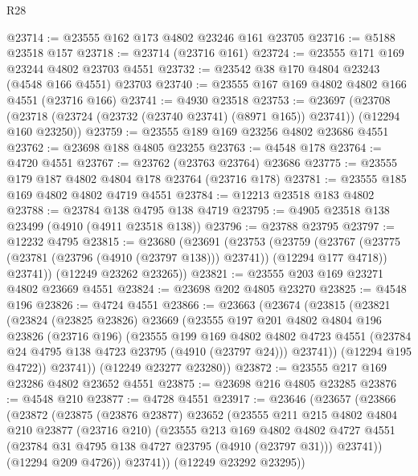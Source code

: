 \begin{lexlean}{R28}
\begin{coremodule}
@23714 := @23555 @162 @173 @4802 @23246 @161 @23705
@23716 := @5188 @23518 @157
@23718 := @23714 (@23716 @161)
@23724 := @23555 @171 @169 @23244 @4802 @23703 @4551
@23732 := @23542 @38 @170 @4804 @23243 (@4548 @166 @4551) @23703
@23740 := @23555 @167 @169 @4802 @4802 @166 @4551 (@23716 @166)
@23741 := @4930 @23518
@23753 := @23697
    (@23708 (@23718 (@23724 (@23732 (@23740 @23741) (@8971 @165)) @23741)) (@12294 @160 @23250))
@23759 := @23555 @189 @169 @23256 @4802 @23686 @4551
@23762 := @23698 @188 @4805 @23255
@23763 := @4548 @178
@23764 := @4720 @4551
@23767 := @23762 (@23763 @23764) @23686
@23775 := @23555 @179 @187 @4802 @4804 @178 @23764 (@23716 @178)
@23781 := @23555 @185 @169 @4802 @4802 @4719 @4551
@23784 := @12213 @23518 @183 @4802
@23788 := @23784 @138 @4795 @138 @4719
@23795 := @4905 @23518 @138 @23499 (@4910 (@4911 @23518 @138))
@23796 := @23788 @23795
@23797 := @12232 @4795
@23815 := @23680
    (@23691
      (@23753
        (@23759
          (@23767 (@23775 (@23781 (@23796 (@4910 (@23797 @138))) @23741)) (@12294 @177 @4718))
          @23741))
      (@12249 @23262 @23265))
@23821 := @23555 @203 @169 @23271 @4802 @23669 @4551
@23824 := @23698 @202 @4805 @23270
@23825 := @4548 @196
@23826 := @4724 @4551
@23866 := @23663
    (@23674
      (@23815
        (@23821
          (@23824
            (@23825 @23826)
            @23669
            (@23555
              @197
              @201
              @4802
              @4804
              @196
              @23826
              (@23716 @196)
              (@23555
                @199
                @169
                @4802
                @4802
                @4723
                @4551
                (@23784 @24 @4795 @138 @4723 @23795 (@4910 (@23797 @24)))
                @23741))
            (@12294 @195 @4722))
          @23741))
      (@12249 @23277 @23280))
@23872 := @23555 @217 @169 @23286 @4802 @23652 @4551
@23875 := @23698 @216 @4805 @23285
@23876 := @4548 @210
@23877 := @4728 @4551
@23917 := @23646
    (@23657
      (@23866
        (@23872
          (@23875
            (@23876 @23877)
            @23652
            (@23555
              @211
              @215
              @4802
              @4804
              @210
              @23877
              (@23716 @210)
              (@23555
                @213
                @169
                @4802
                @4802
                @4727
                @4551
                (@23784 @31 @4795 @138 @4727 @23795 (@4910 (@23797 @31)))
                @23741))
            (@12294 @209 @4726))
          @23741))
      (@12249 @23292 @23295))

\end{coremodule}
\end{lexlean}
